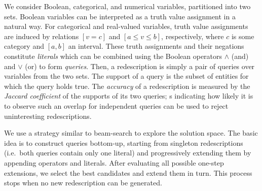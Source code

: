 \documentclass{llncs}
\begin{document}
We consider Boolean, categorical, and numerical variables, partitioned
into two sets. Boolean variables can be interpreted as a truth value
assignment in a natural way.  For categorical and real-valued
variables, truth value assignments are induced by relations $[v=c]$
and $[a \leq v \leq b]$, respectively, where $c$ is some category and
$[a, b]$ an interval.  These truth assignments and their negations
constitute \emph{literals} which can be combined using the Boolean
operators $\land$ (and) and $\lor$ (or) to form \emph{queries}.  Then,
a redescription is simply a pair of queries over variables from the
two sets.  The support of a query is the subset of entities for which
the query holds true.  The \emph{accuracy} of a redescription is
measured by the \emph{Jaccard coefficient} of the supports of its two
queries; \pValue{}s indicating how likely it is to observe such an
overlap for independent queries can be used to reject uninteresting
redescriptions.

We use a strategy similar to beam-search to explore the
solution space.  The basic idea is to construct queries bottom-up,
starting from singleton redescriptions (i.e.\ both queries contain
only one literal) and progressively extending them by appending
operators and literals. %
After evaluating all
possible one-step extensions, we select the best candidates and extend
them in turn. This process stops when no new redescription can
be generated.

\end{document}
